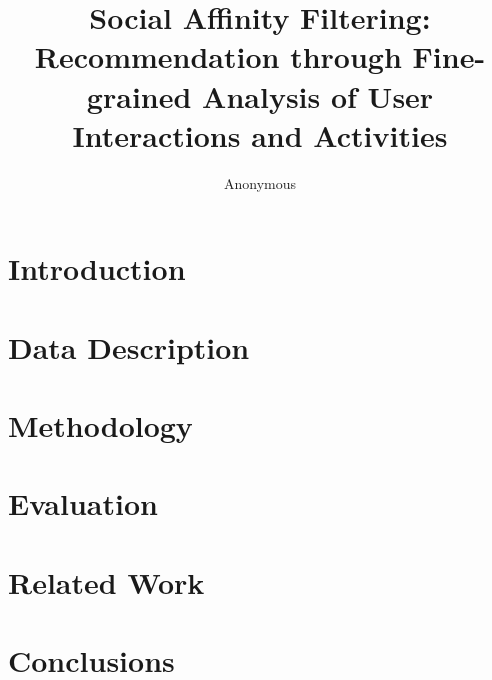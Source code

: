 \documentclass[letterpaper]{article}
\begin{document}
\title{Social Affinity Filtering: Recommendation through Fine-grained Analysis of User Interactions and Activities}
\author{Anonymous}
\maketitle
\begin{abstract}

\end{abstract}

\section{Introduction}

%

\section{Data Description}



\section{Methodology}



\section{Evaluation}



\section{Related Work}

%

\section{Conclusions}

%

%

\end{document}

